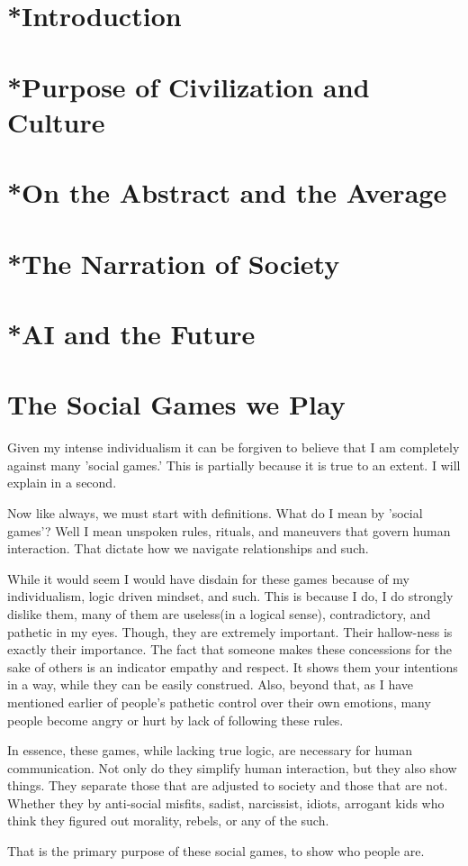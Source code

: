 \section{*Introduction}
\section{*Purpose of Civilization and Culture}
\section{*On the Abstract and the Average}
\section{*The Narration of Society}

\section{*AI and the Future}
\section{The Social Games we Play}
\par Given my intense individualism it can be forgiven to believe that I am completely against many 'social games.' This is partially because it is true to an extent. I will explain in a second.
\par Now like always, we must start with definitions. What do I mean by 'social games'? Well I mean unspoken rules, rituals, and maneuvers that govern human interaction. That dictate how we navigate relationships and such.
\par While it would seem I would have disdain for these games because of my individualism, logic driven mindset, and such. This is because I do, I do strongly dislike them, many of them are useless(in a logical sense), contradictory, and pathetic in my eyes. Though, they are extremely important. Their hallow-ness is exactly their importance. The fact that someone makes these concessions for the sake of others is an indicator empathy and respect. It shows them your intentions in a way, while they can be easily construed. Also, beyond that, as I have mentioned earlier of people's pathetic control over their own emotions, many people become angry or hurt by lack of following these rules. 
\par In essence, these games, while lacking true logic, are necessary for human communication. Not only do they simplify human interaction, but they also show things. They separate those that are adjusted to society and those that are not. Whether they by anti-social misfits, sadist, narcissist, idiots, arrogant kids who think they figured out morality, rebels, or any of the such.
\par That is the primary purpose of these social games, to show who people are.
